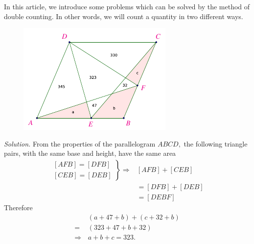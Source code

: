 \begin{multicols}{2}
	In this article, we introduce some problems which can be solved by the method of double counting. In other words, we will count a quantity in two different ways.
	\vskip 0.2cm
	\begin{figure}[H]
		\centering
		\vspace*{-5pt}
		\captionsetup{labelformat= empty, justification=centering}
		\includegraphics[width=1\linewidth]{hc-2022-2-2-6.pdf}
		\vspace*{-10pt}
	\end{figure}
	\textit{Solution.}
	From the properties of the parallelogram $ABCD,$ the following triangle pairs, with the same base and height, have the same area
	\begin{align*}
		\left.
		\begin{aligned}
			[AFB] = [DFB]\\
			[CEB] = [DEB]
		\end{aligned}
		\right\}
		\Rightarrow& [AFB] + [CEB] \\
		&= [DFB] + [DEB] \\
		&= [DEBF]
	\end{align*}
	Therefore
	\begin{align*}
		&(a + 47 + b) + (c + 32 + b)\\
		= \,&(323 + 47 + b + 32)\\
		\Rightarrow\, &a + b + c = 323.
	\end{align*}
	\vspace*{0.1pt}
	

\end{multicols}
